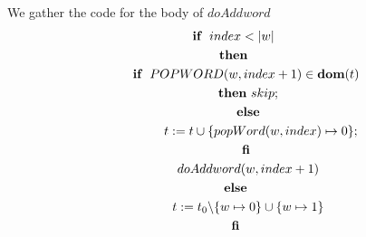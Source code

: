 \documentclass[a4paper,12pt,fleqn]{scrartcl}
\newcommand{\domt}{\textbf{dom}(t)}
\begin{document}
We gather the code for the body of $doAddword$
\begin{gather*}
    \IF\ ~index<|w|~\\
    \THEN\ \\
    \qquad \IF\ ~POPWORD(w,index+1)\in\domt~\\
    \qquad \THEN\ skip;\\
    \qquad \ELSE\\
    \qquad\qquad t\Ass t \cup \{popWord(w,index)\mapsto 0 \};\\
    \qquad \FI\ \\
    \qquad doAddword(w, index +1)\\
    \ELSE \\
    \qquad t \Ass t_0 \backslash \{ w\mapsto 0 \} \cup \{ w \mapsto 1\}\\
    \FI
\end{gather*}
\end{document}
